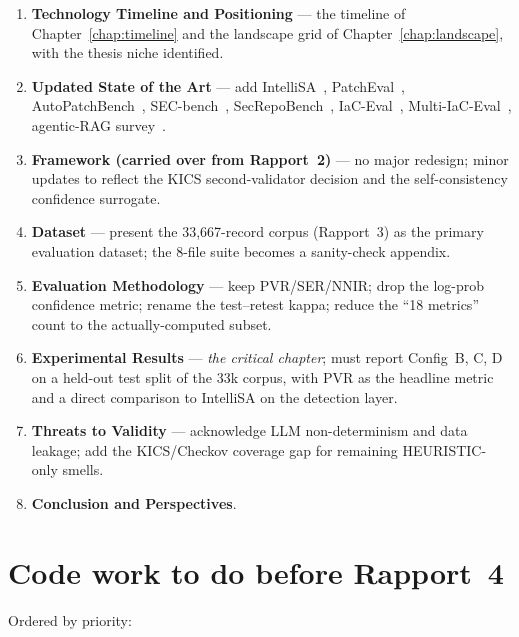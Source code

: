\documentclass[11pt, a4paper]{report}
\begin{document}
\begin{enumerate}
  \item \textbf{Technology Timeline and Positioning} --- the timeline of
        Chapter~\ref{chap:timeline} and the landscape grid of
        Chapter~\ref{chap:landscape}, with the thesis niche identified.
  \item \textbf{Updated State of the Art} --- add IntelliSA~\citep{intellisa2026},
        PatchEval~\citep{lyu2024patcheval}, AutoPatchBench~\citep{autopatchbench2025},
        SEC-bench~\citep{secbench2025}, SecRepoBench~\citep{secrepobench2025},
        IaC-Eval~\citep{kon2024iaceval}, Multi-IaC-Eval~\citep{multi2025iaceval},
        agentic-RAG survey~\citep{agenticrag2025survey}.
  \item \textbf{Framework (carried over from Rapport~2)} --- no major
        redesign; minor updates to reflect the KICS second-validator
        decision and the self-consistency confidence surrogate.
  \item \textbf{Dataset} --- present the 33{,}667-record corpus
        (Rapport~3) as the primary evaluation dataset; the 8-file suite
        becomes a sanity-check appendix.
  \item \textbf{Evaluation Methodology} --- keep PVR/SER/NNIR; drop the
        log-prob confidence metric; rename the test--retest kappa;
        reduce the ``18 metrics'' count to the actually-computed
        subset.
  \item \textbf{Experimental Results} --- \emph{the critical chapter};
        must report Config~B, C, D on a held-out test split of the 33k
        corpus, with PVR as the headline metric and a direct
        comparison to IntelliSA on the detection layer.
  \item \textbf{Threats to Validity} --- acknowledge LLM non-determinism
        and data leakage; add the KICS/Checkov coverage gap for
        remaining HEURISTIC-only smells.
  \item \textbf{Conclusion and Perspectives}.
\end{enumerate}

\section{Code work to do before Rapport~4}

Ordered by priority:
\end{document}
